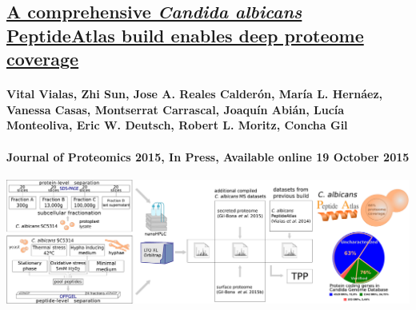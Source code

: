 %
%

\begin{otherlanguage}{british}

\chapter*{\href{http://www.ncbi.nlm.nih.gov/pubmed/26493587}{A comprehensive \textit{Candida albicans} PeptideAtlas build enables deep proteome coverage}}






\subsubsection*{Vital Vialas, Zhi Sun, Jose A. Reales Calder\'on, Mar\'ia L. Hern\'aez, Vanessa Casas, Montserrat Carrascal, Joaqu\'in Abi\'an, Luc\'ia Monteoliva, Eric W. Deutsch, Robert L. Moritz, Concha Gil}
\subsubsection*{Journal of Proteomics 2015, In Press, Available online 19 October 2015}

\bigskip
\hfill
\includegraphics[width=1\textwidth]{Imagenes/Vectorial/graphical_abstract_PeptideAtlas2}





\end{otherlanguage}
